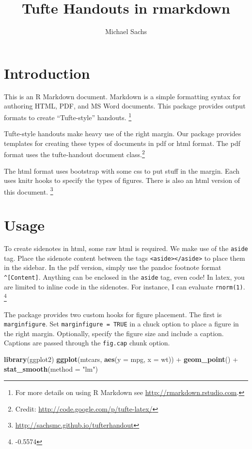 \documentclass{tufte-handout}
\title{Tufte Handouts in rmarkdown}
\author{Michael Sachs}
\newenvironment{Shaded}{}{}
\newcommand{\KeywordTok}[1]{\textcolor[rgb]{0.00,0.44,0.13}{\textbf{{#1}}}}
\newcommand{\DataTypeTok}[1]{\textcolor[rgb]{0.56,0.13,0.00}{{#1}}}
\newcommand{\StringTok}[1]{\textcolor[rgb]{0.25,0.44,0.63}{{#1}}}
\newcommand{\NormalTok}[1]{{#1}}
\begin{document}
\maketitle

\section{Introduction}\label{introduction}

This is an R Markdown document. Markdown is a simple formatting syntax
for authoring HTML, PDF, and MS Word documents. This package provides
output formats to create ``Tufte-style'' handouts. \footnote{For more
  details on using R Markdown see \url{http://rmarkdown.rstudio.com}.}

Tufte-style handouts make heavy use of the right margin. Our package
provides templates for creating these types of documents in pdf or html
format. The pdf format uses the tufte-handout document class.\footnote{Credit:
  \url{http://code.google.com/p/tufte-latex/}}

The html format uses bootstrap with some css to put stuff in the margin.
Each uses knitr hooks to specify the types of figures. There is also an
html version of this document. \footnote{\url{http://sachsmc.github.io/tufterhandout}}

\section{Usage}\label{usage}

To create sidenotes in html, some raw html is required. We make use of
the \texttt{aside} tag. Place the sidenote content between the tags
\texttt{\textless{}aside\textgreater{}\textless{}/aside\textgreater{}}
to place them in the sidebar. In the pdf version, simply use the pandoc
footnote format \texttt{\^{}{[}Content{]}}. Anything can be enclosed in
the \texttt{aside} tag, even code! In latex, you are limited to inline
code in the sidenotes. For instance, I can evaluate \texttt{rnorm(1)}.
\footnote{-0.5574}

The package provides two custom hooks for figure placement. The first is
\texttt{marginfigure}. Set \texttt{marginfigure = TRUE} in a chuck
option to place a figure in the right margin. Optionally, specify the
figure size and include a caption. Captions are passed through the
\texttt{fig.cap} chunk option.

\begin{Shaded}
\begin{Highlighting}[]
\KeywordTok{library}\NormalTok{(ggplot2)}
\KeywordTok{ggplot}\NormalTok{(mtcars, }\KeywordTok{aes}\NormalTok{(}\DataTypeTok{y =} \NormalTok{mpg, }\DataTypeTok{x =} \NormalTok{wt)) +}\StringTok{ }\KeywordTok{geom_point}\NormalTok{() +}\StringTok{ }
\StringTok{    }\KeywordTok{stat_smooth}\NormalTok{(}\DataTypeTok{method =} \StringTok{"lm"}\NormalTok{)}
\end{Highlighting}
\end{Shaded}
\end{document}
